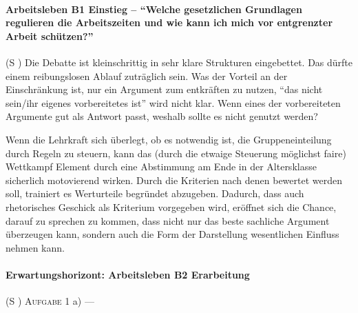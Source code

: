 \paragraph{Arbeitsleben B1 Einstieg -- \enquote{Welche gesetzlichen Grundlagen regulieren die Arbeitszeiten und wie kann ich mich vor entgrenzter Arbeit schützen?}} (\gls{S} \pageref{ARBEITSLEBEN-B1})
Die Debatte ist kleinschrittig in sehr klare Strukturen eingebettet. Das dürfte einem reibungslosen Ablauf zuträglich sein. Was der Vorteil an der Einschränkung ist, nur ein Argument zum entkräften zu nutzen, \enquote{das nicht sein/ihr eigenes vorbereitetes ist} wird nicht klar. Wenn eines der vorbereiteten Argumente gut als Antwort passt, weshalb sollte es nicht genutzt werden?  

Wenn die Lehrkraft sich überlegt, ob es notwendig ist, die Gruppeneinteilung durch Regeln zu steuern, kann das (durch die etwaige Steuerung möglichst faire) Wettkampf Element durch eine Abstimmung am Ende in der Altersklasse sicherlich motovierend wirken. Durch die Kriterien nach denen bewertet werden soll, trainiert es Werturteile begründet abzugeben. Dadurch, dass auch rhetorisches Geschick als Kriterium vorgegeben wird, eröffnet sich die Chance, darauf zu sprechen zu kommen, dass nicht nur das beste sachliche Argument überzeugen kann, sondern auch die Form der Darstellung wesentlichen Einfluss nehmen kann. 


\paragraph{Erwartungshorizont: Arbeitsleben B2 Erarbeitung} (\gls{S} \pageref{ARBEITSLEBEN-B2})
\textsc{Aufgabe 1} a) \quad ---


